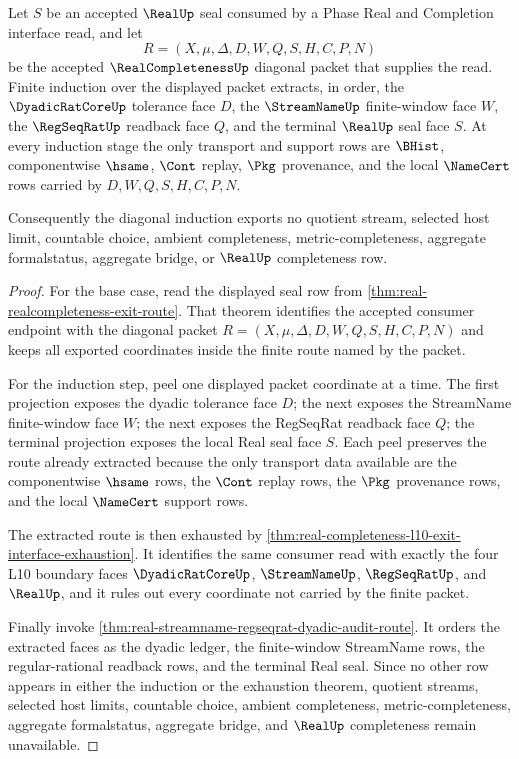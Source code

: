 \begin{theorem}
\label{thm:real-realcompleteness-finite-diagonal-induction}
Let $S$ be an accepted $\RealUp$ seal consumed by a Phase Real and Completion
interface read, and let
$$
R=(X,\mu,\Delta,D,W,Q,S,H,C,P,N)
$$
be the accepted $\RealCompletenessUp$ diagonal packet that supplies the read.
Finite induction over the displayed packet extracts, in order, the
$\DyadicRatCoreUp$ tolerance face $D$, the $\StreamNameUp$ finite-window face
$W$, the $\RegSeqRatUp$ readback face $Q$, and the terminal $\RealUp$ seal face
$S$. At every induction stage the only transport and support rows are
$\BHist$, componentwise $\hsame$, $\Cont$ replay, $\Pkg$ provenance, and the
local $\NameCert$ rows carried by $D,W,Q,S,H,C,P,N$.

Consequently the diagonal induction exports no quotient stream, selected host
limit, countable choice, ambient completeness, metric-completeness, aggregate
formalstatus, aggregate bridge, or $\RealUp$ completeness row.
\end{theorem}
\begin{proof}
For the base case, read the displayed seal row from
\autoref{thm:real-realcompleteness-exit-route}. That theorem identifies the
accepted consumer endpoint with the diagonal packet
$R=(X,\mu,\Delta,D,W,Q,S,H,C,P,N)$ and keeps all exported coordinates inside the
finite route named by the packet.

For the induction step, peel one displayed packet coordinate at a time. The
first projection exposes the dyadic tolerance face $D$; the next exposes the
StreamName finite-window face $W$; the next exposes the RegSeqRat readback face
$Q$; the terminal projection exposes the local Real seal face $S$. Each peel
preserves the route already extracted because the only transport data available
are the componentwise $\hsame$ rows, the $\Cont$ replay rows, the $\Pkg$
provenance rows, and the local $\NameCert$ support rows.

The extracted route is then exhausted by
\autoref{thm:real-completeness-l10-exit-interface-exhaustion}. It identifies the
same consumer read with exactly the four L10 boundary faces
$\DyadicRatCoreUp$, $\StreamNameUp$, $\RegSeqRatUp$, and $\RealUp$, and it rules
out every coordinate not carried by the finite packet.

Finally invoke \autoref{thm:real-streamname-regseqrat-dyadic-audit-route}. It
orders the extracted faces as the dyadic ledger, the finite-window StreamName
rows, the regular-rational readback rows, and the terminal Real seal. Since no
other row appears in either the induction or the exhaustion theorem, quotient
streams, selected host limits, countable choice, ambient completeness,
metric-completeness, aggregate formalstatus, aggregate bridge, and $\RealUp$
completeness remain unavailable.
\end{proof}

